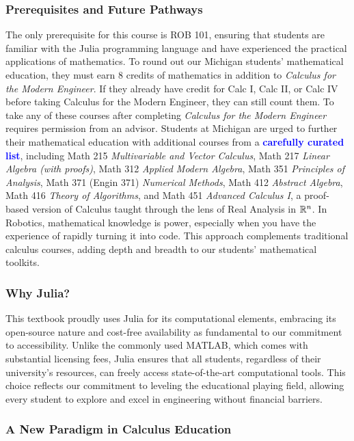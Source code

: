 \subsubsection{Prerequisites and Future Pathways}

The only prerequisite for this course is ROB 101, ensuring that students are familiar with the Julia programming language and have experienced the practical applications of mathematics. To round out our Michigan students' mathematical education, they must earn 8 credits of mathematics in addition to \textit{Calculus for the Modern Engineer}. If they already have credit for Calc I, Calc II, or Calc IV before taking Calculus for the Modern Engineer, they can still count them. To take any of these courses after completing \textit{Calculus for the Modern Engineer} requires permission from an advisor. \hypertarget{CuratedListCourses}{Students at Michigan are urged to further their mathematical education with additional courses from a \textcolor{blue}{\bf carefully curated list}, including Math 215 {\it Multivariable and Vector Calculus}, Math 217 {\it Linear Algebra (with proofs)}, Math 312 {\it Applied Modern Algebra}, Math 351 {\it Principles of Analysis}, Math 371 (Engin 371) {\it Numerical Methods}, Math 412 {\it Abstract Algebra}, Math 416 {\it Theory of Algorithms}, and Math 451 {\it Advanced Calculus I}, a proof-based version of Calculus taught through the lens of Real Analysis in $\mathbb R^n$. In Robotics, mathematical knowledge is power, especially when you have the experience of rapidly turning it into code. 
 This approach complements traditional calculus courses, adding depth and breadth to our students' mathematical toolkits.}

\subsubsection{Why Julia?}

This textbook proudly uses Julia for its computational elements, embracing its open-source nature and cost-free availability as fundamental to our commitment to accessibility. Unlike the commonly used MATLAB, which comes with substantial licensing fees, Julia ensures that all students, regardless of their university's resources, can freely access state-of-the-art computational tools. This choice reflects our commitment to leveling the educational playing field, allowing every student to explore and excel in engineering without financial barriers.

\subsubsection{A New Paradigm in Calculus Education}

